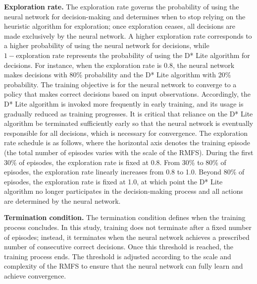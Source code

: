 \textbf{Exploration rate.} The exploration rate governs the probability of using the neural network for decision-making and determines when to stop relying on the heuristic algorithm for exploration; once exploration ceases, all decisions are made exclusively by the neural network. A higher exploration rate corresponds to a higher probability of using the neural network for decisions, while $1 - \text{exploration rate}$ represents the probability of using the D* Lite algorithm for decisions. For instance, when the exploration rate is 0.8, the neural network makes decisions with 80\% probability and the D* Lite algorithm with 20\% probability. The training objective is for the neural network to converge to a policy that makes correct decisions based on input observations. Accordingly, the D* Lite algorithm is invoked more frequently in early training, and its usage is gradually reduced as training progresses. It is critical that reliance on the D* Lite algorithm be terminated sufficiently early so that the neural network is eventually responsible for all decisions, which is necessary for convergence. The exploration rate schedule is as follows, where the horizontal axis denotes the training episode (the total number of episodes varies with the scale of the RMFS). During the first 30\% of episodes, the exploration rate is fixed at 0.8. From 30\% to 80\% of episodes, the exploration rate linearly increases from 0.8 to 1.0. Beyond 80\% of episodes, the exploration rate is fixed at 1.0, at which point the D* Lite algorithm no longer participates in the decision-making process and all actions are determined by the neural network.

\textbf{Termination condition.} The termination condition defines when the training process concludes. In this study, training does not terminate after a fixed number of episodes; instead, it terminates when the neural network achieves a prescribed number of consecutive correct decisions. Once this threshold is reached, the training process ends. The threshold is adjusted according to the scale and complexity of the RMFS to ensure that the neural network can fully learn and achieve convergence.
